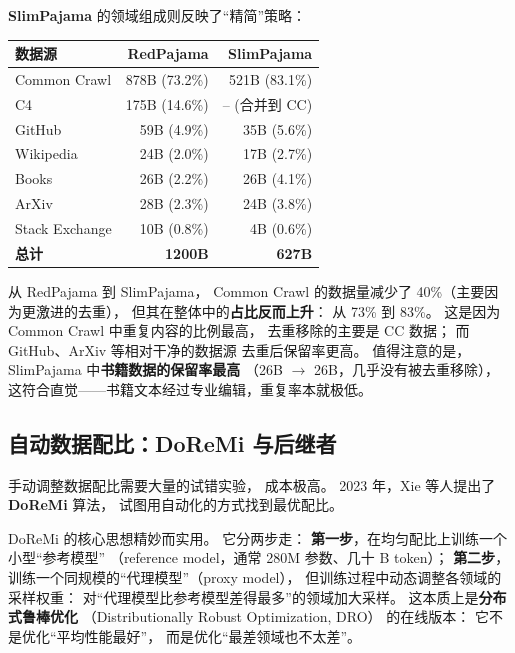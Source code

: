 \textbf{SlimPajama} 的领域组成则反映了“精简”策略：

\begin{center}\small
\renewcommand{\arraystretch}{1.3}
\begin{tabular}{lrr}
\toprule
\rowcolor{figLightGray}
\textbf{数据源} & \textbf{RedPajama} & \textbf{SlimPajama} \\
\midrule
Common Crawl & 878B (73.2\%) & 521B (83.1\%) \\
C4 & 175B (14.6\%) & -- (合并到 CC) \\
GitHub & 59B (4.9\%) & 35B (5.6\%) \\
Wikipedia & 24B (2.0\%) & 17B (2.7\%) \\
Books & 26B (2.2\%) & 26B (4.1\%) \\
ArXiv & 28B (2.3\%) & 24B (3.8\%) \\
Stack Exchange & 10B (0.8\%) & 4B (0.6\%) \\
\midrule
\textbf{总计} & \textbf{1200B} & \textbf{627B} \\
\bottomrule
\end{tabular}
\end{center}

从 RedPajama 到 SlimPajama，
Common Crawl 的数据量减少了 40\%（主要因为更激进的去重），
但其在整体中的\textbf{占比反而上升}：
从 73\% 到 83\%。
这是因为 Common Crawl 中重复内容的比例最高，
去重移除的主要是 CC 数据；
而 GitHub、ArXiv 等相对干净的数据源
去重后保留率更高。
值得注意的是，SlimPajama 中\textbf{书籍数据的保留率最高}
（26B $\to$ 26B，几乎没有被去重移除），
这符合直觉——书籍文本经过专业编辑，重复率本就极低。

\subsection{自动数据配比：DoReMi 与后继者}

手动调整数据配比需要大量的试错实验，
成本极高。
2023 年，Xie 等人提出了 \textbf{DoReMi} 算法，
试图用自动化的方式找到最优配比。

DoReMi 的核心思想精妙而实用。
它分两步走：
\textbf{第一步}，在均匀配比上训练一个小型“参考模型”
（reference model，通常 280M 参数、几十 B token）；
\textbf{第二步}，训练一个同规模的“代理模型”（proxy model），
但训练过程中动态调整各领域的采样权重：
对“代理模型比参考模型差得最多”的领域加大采样。
这本质上是\textbf{分布式鲁棒优化}
（Distributionally Robust Optimization, DRO）
的在线版本：
它不是优化“平均性能最好”，
而是优化“最差领域也不太差”。

